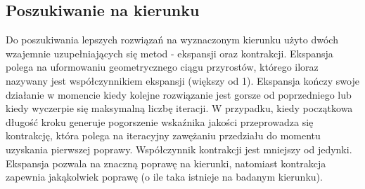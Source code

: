 \subsection{Poszukiwanie na kierunku}
Do poszukiwania lepszych rozwiązań na wyznaczonym kierunku użyto dwóch wzajemnie uzupełniających się metod - ekspansji oraz kontrakcji. Ekspansja polega na uformowaniu geometrycznego ciągu przyrostów, którego iloraz nazywany jest współczynnikiem ekspansji (większy od 1). Ekspansja kończy swoje działanie w momencie kiedy kolejne rozwiązanie jest gorsze od poprzedniego lub kiedy wyczerpie się maksymalną liczbę iteracji. W przypadku, kiedy początkowa długość kroku generuje pogorszenie wskaźnika jakości przeprowadza się kontrakcję, która polega na iteracyjny zawężaniu przedziału do momentu uzyskania pierwszej poprawy. Współczynnik kontrakcji jest mniejszy od jedynki. Ekspansja pozwala na znaczną poprawę na kierunki, natomiast kontrakcja zapewnia jakąkolwiek poprawę (o ile taka istnieje na badanym kierunku).
